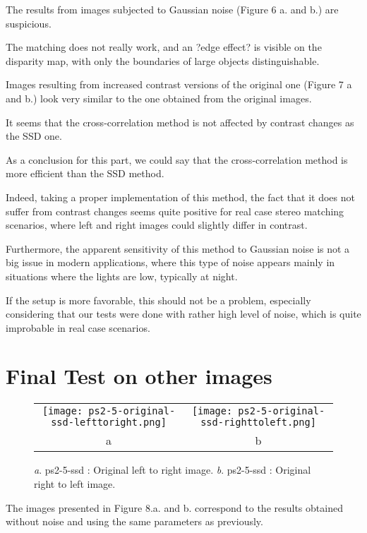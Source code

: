 \documentclass[a4paper,11pt]{article}
\begin{document}
The results from images subjected to Gaussian noise (Figure 6 a. and b.) are suspicious.

The matching does not really work, and an ?edge effect? is visible on the disparity map, with only the boundaries of large objects distinguishable.

Images resulting from increased contrast versions of the original one (Figure 7 a and b.) look very similar to the one obtained from the original images.

It seems that  the cross-correlation method is not affected by contrast changes as the SSD one.

As a conclusion for this part, we could say that the cross-correlation method is more efficient than the SSD method.

Indeed, taking a proper implementation of this method, the fact that it does not suffer from contrast changes seems quite positive for real case stereo matching scenarios, where left and right images could slightly differ in contrast.

Furthermore, the apparent sensitivity of this method to Gaussian noise is not a big issue in modern applications, where this type of noise appears mainly in situations where the lights are low, typically at night.

If the setup is more favorable, this should not be a problem, especially considering that our tests were done with rather high level of noise, which is quite improbable in real case scenarios.

\section{Final Test on other images}


 \begin{figure}[H]
\begin{center}
\begin{tabular}{cc}
	\texttt{[image: ps2-5-original-ssd-lefttoright.png]}&
	\texttt{[image: ps2-5-original-ssd-righttoleft.png]}\\
	a&b
\end{tabular}
\end{center}
\caption{ 
\textit{a}. ps2-5-ssd : Original left to right image.  \textit{b}. ps2-5-ssd : Original right to left image. }
\label{ps2-1}
\end{figure}


The images presented in Figure 8.a. and b. correspond to the results obtained without noise and using the same parameters as previously.
\end{document}

